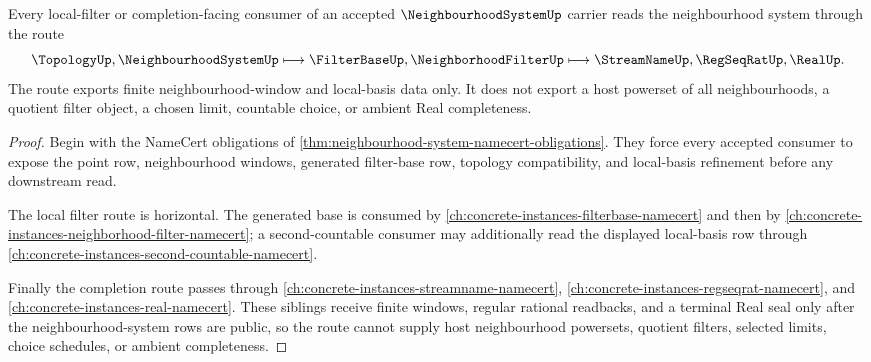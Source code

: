 \begin{theorem}
\label{thm:neighbourhood-system-filter-basis-route}
Every local-filter or completion-facing consumer of an accepted $\NeighbourhoodSystemUp$ carrier reads the neighbourhood system through the route
$$
\TopologyUp,\NeighbourhoodSystemUp \longmapsto \FilterBaseUp,\NeighborhoodFilterUp \longmapsto \StreamNameUp,\RegSeqRatUp,\RealUp .
$$
The route exports finite neighbourhood-window and local-basis data only. It does not export a host powerset of all neighbourhoods, a quotient filter object, a chosen limit, countable choice, or ambient Real completeness.
\end{theorem}
\begin{proof}
Begin with the NameCert obligations of \autoref{thm:neighbourhood-system-namecert-obligations}. They force every accepted consumer to expose the point row, neighbourhood windows, generated filter-base row, topology compatibility, and local-basis refinement before any downstream read.

The local filter route is horizontal. The generated base is consumed by \autoref{ch:concrete-instances-filterbase-namecert} and then by \autoref{ch:concrete-instances-neighborhood-filter-namecert}; a second-countable consumer may additionally read the displayed local-basis row through \autoref{ch:concrete-instances-second-countable-namecert}.

Finally the completion route passes through \autoref{ch:concrete-instances-streamname-namecert}, \autoref{ch:concrete-instances-regseqrat-namecert}, and \autoref{ch:concrete-instances-real-namecert}. These siblings receive finite windows, regular rational readbacks, and a terminal Real seal only after the neighbourhood-system rows are public, so the route cannot supply host neighbourhood powersets, quotient filters, selected limits, choice schedules, or ambient completeness.
\end{proof}



